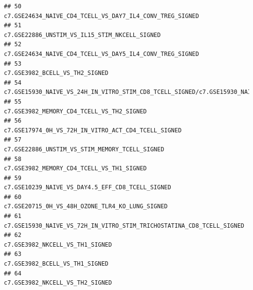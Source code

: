 \documentclass{article}\usepackage[]{graphicx}\usepackage[]{color}
\makeatletter
\newenvironment{kframe}{%
 \def\at@end@of@kframe{}%
 \ifinner\ifhmode%
  \def\at@end@of@kframe{\end{minipage}}%
  \begin{minipage}{\columnwidth}%
 \fi\fi%
 \def\FrameCommand##1{\hskip\@totalleftmargin \hskip-\fboxsep
 \colorbox{shadecolor}{##1}\hskip-\fboxsep
     \hskip-\linewidth \hskip-\@totalleftmargin \hskip\columnwidth}%
 \MakeFramed {\advance\hsize-\width
   \@totalleftmargin\z@ \linewidth\hsize
   \@setminipage}}%
 {\par\unskip\endMakeFramed%
 \at@end@of@kframe}
\newenvironment{knitrout}{}{} %
\makeatother
\begin{document}
\begin{knitrout}
\begin{kframe}
\begin{verbatim}
## 50                                                                                                                           c7.GSE24634_NAIVE_CD4_TCELL_VS_DAY7_IL4_CONV_TREG_SIGNED
## 51                                                                                                                                      c7.GSE22886_UNSTIM_VS_IL15_STIM_NKCELL_SIGNED
## 52                                                                                                                           c7.GSE24634_NAIVE_CD4_TCELL_VS_DAY5_IL4_CONV_TREG_SIGNED
## 53                                                                                                                                                     c7.GSE3982_BCELL_VS_TH2_SIGNED
## 54 c7.GSE15930_NAIVE_VS_24H_IN_VITRO_STIM_CD8_TCELL_SIGNED/c7.GSE15930_NAIVE_VS_24H_IN_VITRO_STIM_IL12_CD8_TCELL_SIGNED/c7.GSE15930_NAIVE_VS_24H_IN_VITRO_STIM_INFAB_CD8_TCELL_SIGNED
## 55                                                                                                                                          c7.GSE3982_MEMORY_CD4_TCELL_VS_TH2_SIGNED
## 56                                                                                                                                c7.GSE17974_0H_VS_72H_IN_VITRO_ACT_CD4_TCELL_SIGNED
## 57                                                                                                                                     c7.GSE22886_UNSTIM_VS_STIM_MEMORY_TCELL_SIGNED
## 58                                                                                                                                          c7.GSE3982_MEMORY_CD4_TCELL_VS_TH1_SIGNED
## 59                                                                                                                                   c7.GSE10239_NAIVE_VS_DAY4.5_EFF_CD8_TCELL_SIGNED
## 60                                                                                                                                    c7.GSE20715_0H_VS_48H_OZONE_TLR4_KO_LUNG_SIGNED
## 61                                                                                                              c7.GSE15930_NAIVE_VS_72H_IN_VITRO_STIM_TRICHOSTATINA_CD8_TCELL_SIGNED
## 62                                                                                                                                                    c7.GSE3982_NKCELL_VS_TH1_SIGNED
## 63                                                                                                                                                     c7.GSE3982_BCELL_VS_TH1_SIGNED
## 64                                                                                                                                                    c7.GSE3982_NKCELL_VS_TH2_SIGNED

\end{verbatim}
\end{kframe}
\end{knitrout}
\end{document}
